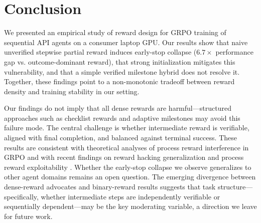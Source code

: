 \documentclass[11pt]{article}
\begin{document}
\section{Conclusion}
\label{sec:conclusion}

We presented an empirical study of reward design for GRPO training of sequential API agents on a consumer laptop GPU.
Our results show that naive unverified stepwise partial reward induces early-stop collapse ($6.7\times$ performance gap vs. outcome-dominant reward), that strong initialization mitigates this vulnerability, and that a simple verified milestone hybrid does not resolve it.
Together, these findings point to a non-monotonic tradeoff between reward density and training stability in our setting.

Our findings do not imply that all dense rewards are harmful---structured approaches such as checklist rewards \citep{cm2_2025} and adaptive milestones \citep{admire2025} may avoid this failure mode.
The central challenge is whether intermediate reward is verifiable, aligned with final completion, and balanced against terminal success.
These results are consistent with theoretical analyses of process reward interference in GRPO \citep{sullivan2025grpoprm,gao2024designing,mogrpo2025} and with recent findings on reward hacking generalization \citep{macdiarmid2025misalignment,taylor2025school} and process reward exploitability \citep{khalifa2026countdown,tiwari2026prm}.
Whether the early-stop collapse we observe generalizes to other agent domains remains an open question.
The emerging divergence between dense-reward advocates \citep{seta2026,zhu2025planner} and binary-reward results \citep{gandhi2026endless,wei2025webagent} suggests that task structure---specifically, whether intermediate steps are independently verifiable or sequentially dependent---may be the key moderating variable, a direction we leave for future work.



\end{document}
